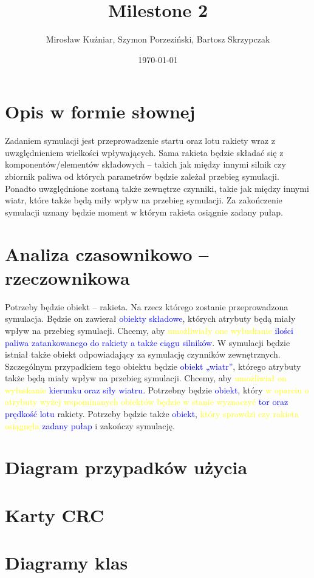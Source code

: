 \documentclass{article}
\title{Milestone 2}
\author{Mirosław Kuźniar, Szymon Porzeziński, Bartosz Skrzypczak }
\date{\today}
\begin{document}
\maketitle

\section{Opis w formie słownej}
Zadaniem symulacji jest przeprowadzenie startu oraz lotu rakiety wraz z uwzględnieniem wielkości wpływających. Sama rakieta będzie składać się z komponentów/elementów składowych – takich jak między innymi silnik czy zbiornik paliwa od których parametrów będzie zależał przebieg symulacji. Ponadto uwzględnione zostaną także zewnętrze czynniki, takie jak między innymi wiatr, które także będą miły wpływ na przebieg symulacji. Za zakończenie symulacji uznany będzie moment w którym rakieta osiągnie zadany pułap. 

\section{Analiza czasownikowo – rzeczownikowa}
Potrzeby będzie obiekt – rakieta. Na rzecz którego zostanie przeprowadzona symulacja. Będzie on zawierał \textcolor{blue}{obiekty składowe}, których atrybuty będą miały wpływ na przebieg symulacji. Chcemy, aby \textcolor{yellow}{umożliwiały one wyłuskanie} \textcolor{blue}{ilości paliwa zatankowanego do rakiety a także ciągu silników}. W symulacji będzie istniał także obiekt odpowiadający za symulację czynników zewnętrznych. Szczególnym przypadkiem tego obiektu będzie \textcolor{blue}{obiekt „wiatr”}, którego atrybuty także będą miały wpływ na przebieg symulacji. Chcemy, aby \textcolor{yellow}{umożliwiał on wyłuskanie} \textcolor{blue}{kierunku oraz siły wiatru}. Potrzebny będzie \textcolor{blue}{obiekt}, który \textcolor{yellow}{w oparciu o atrybuty wyżej wspominanych obiektów będzie w stanie wyznaczyć} \textcolor{blue}{tor oraz prędkość lotu} rakiety. Potrzeby będzie także  \textcolor{blue}{obiekt}, \textcolor{yellow}{który sprawdzi czy rakieta osiągnęła} \textcolor{blue}{zadany pułap} i zakończy symulację. 

\section{Diagram przypadków użycia}

\section{Karty CRC}

\section{Diagramy klas}
\end{document}
